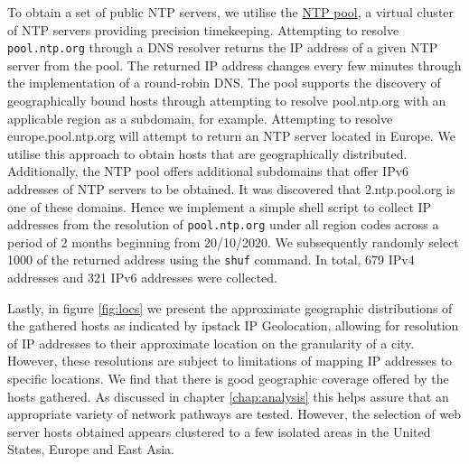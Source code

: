 \documentclass{l4proj}
\begin{document}
To obtain a set of public NTP servers, we utilise the \href{https://www.pool.ntp.org}{NTP pool}, a virtual cluster of NTP servers providing precision timekeeping. Attempting to resolve \lstinline{pool.ntp.org} through a DNS resolver returns the IP address of a given NTP server from the pool. The returned IP address changes every few minutes through the implementation of a round-robin DNS. The pool supports the discovery of geographically bound hosts through attempting to resolve pool.ntp.org with an applicable region as a subdomain, for example. Attempting to resolve europe.pool.ntp.org will attempt to return an NTP server located in Europe. We utilise this approach to obtain hosts that are geographically distributed. Additionally, the NTP pool offers additional subdomains that offer IPv6 addresses of NTP servers to be obtained. It was discovered that 2.ntp.pool.org is one of these domains.
Hence we implement a simple shell script to collect IP addresses from the resolution of \lstinline{pool.ntp.org} under all region codes across a period of 2 months beginning from 20/10/2020. We subsequently randomly select 1000 of the returned address using the \lstinline{shuf} command. In total, 679 IPv4 addresses and 321 IPv6 addresses were collected.

Lastly, in figure \ref{fig:locs} we present the approximate geographic distributions of the gathered hosts as indicated by ipstack IP Geolocation, allowing for resolution of IP addresses to their approximate location on the granularity of a city. However, these resolutions are subject to limitations of mapping IP addresses to specific locations\cite{shavitt_geolocation_2011}. We find that there is good geographic coverage offered by the hosts gathered. As discussed in chapter \ref{chap:analysis} this helps assure that an appropriate variety of network pathways are tested. However, the selection of web server hosts obtained appears clustered to a few isolated areas in the United States, Europe and East Asia.
\end{document}
